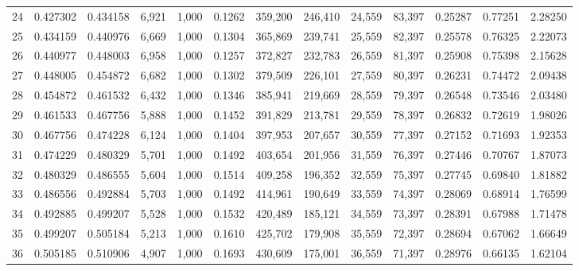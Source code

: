 \begin{tabular}{rrrrrrrrrrrrr}
24  &  0.427302 &  0.434158 &   6,921 &  1,000 &                                     0.1262 &  359,200 &  246,410 &   24,559 &   83,397 &  0.25287 &  0.77251 &  2.28250 \\
25  &  0.434159 &  0.440976 &   6,669 &  1,000 &                                     0.1304 &  365,869 &  239,741 &   25,559 &   82,397 &  0.25578 &  0.76325 &  2.22073 \\
26  &  0.440977 &  0.448003 &   6,958 &  1,000 &                                     0.1257 &  372,827 &  232,783 &   26,559 &   81,397 &  0.25908 &  0.75398 &  2.15628 \\
27  &  0.448005 &  0.454872 &   6,682 &  1,000 &                                     0.1302 &  379,509 &  226,101 &   27,559 &   80,397 &  0.26231 &  0.74472 &  2.09438 \\
28  &  0.454872 &  0.461532 &   6,432 &  1,000 &                                     0.1346 &  385,941 &  219,669 &   28,559 &   79,397 &  0.26548 &  0.73546 &  2.03480 \\
29  &  0.461533 &  0.467756 &   5,888 &  1,000 &                                     0.1452 &  391,829 &  213,781 &   29,559 &   78,397 &  0.26832 &  0.72619 &  1.98026 \\
30  &  0.467756 &  0.474228 &   6,124 &  1,000 &                                     0.1404 &  397,953 &  207,657 &   30,559 &   77,397 &  0.27152 &  0.71693 &  1.92353 \\
31  &  0.474229 &  0.480329 &   5,701 &  1,000 &                                     0.1492 &  403,654 &  201,956 &   31,559 &   76,397 &  0.27446 &  0.70767 &  1.87073 \\
32  &  0.480329 &  0.486555 &   5,604 &  1,000 &                                     0.1514 &  409,258 &  196,352 &   32,559 &   75,397 &  0.27745 &  0.69840 &  1.81882 \\
33  &  0.486556 &  0.492884 &   5,703 &  1,000 &                                     0.1492 &  414,961 &  190,649 &   33,559 &   74,397 &  0.28069 &  0.68914 &  1.76599 \\
34  &  0.492885 &  0.499207 &   5,528 &  1,000 &                                     0.1532 &  420,489 &  185,121 &   34,559 &   73,397 &  0.28391 &  0.67988 &  1.71478 \\
35  &  0.499207 &  0.505184 &   5,213 &  1,000 &                                     0.1610 &  425,702 &  179,908 &   35,559 &   72,397 &  0.28694 &  0.67062 &  1.66649 \\
36  &  0.505185 &  0.510906 &   4,907 &  1,000 &                                     0.1693 &  430,609 &  175,001 &   36,559 &   71,397 &  0.28976 &  0.66135 &  1.62104 \\

\end{tabular}
